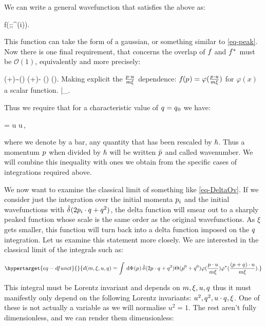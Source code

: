 \documentclass[
  10pt,
  a4paper,
  DIV=11,
  numbers=noendperiod,
  twoside]{scrreprt}
\let\[\relax \let\]\relax %
\DeclareRobustCommand{\[}{\begin{equation}}
\DeclareRobustCommand{\]}{\end{equation}}
\begin{document}
We can write a general wavefunction that satisfies the above as:

\[
f(\vert\cls{\vel[i]};\mass[i] ;\beta^{(i)}).
\]

This function can take the form of a gaussian, or something similar to
\ref{eq-peak}. Now there is one final requirement, that concerns the
overlap of \(\wf\) and \(\cwf\) must be \(\mathcal{O}(1)\), equivalently
and more precisely:

\[
\cwf(\emom+\tm)\sim \cwf(\emom) \implies \cwf(\emom+\tm)- \cwf(\emom) \implies \ct{\tm}\cwf(\emom).
\] Making explicit the \(\frac{\emom \cdot u }{m \xi}\) dependence:
\(\wf(\emom)=\varphi(\frac{\emom \cdot u }{m \xi})\) for \(\varphi(x)\)
a scalar function.
\[\implies {}\Bigr|_{}.\]

Thus we require that for a characteristic value of \(\tm=\co[0]{\tm}\)
we have:

\[
=\co[0]{\tw} \cdot u\iff \co[0]{\tw} \cdot u\,\wfwidth\ll \sqrt{ \xi},
\]

where we denote by a bar, any quantity that has been rescaled by
\(\hbar\). Thus a momentum \(\emom\) when divided by \(\hbar\) will be
written \(\bar{\emom}\) and called wavenumber. We will combine this
inequality with ones we obtain from the specific cases of integrations
required above.

We now want to examine the classical limit of something like
\ref{eq-DeltaOv}. If we consider just the integration over the initial
momenta \(\emom[i]\) and the initial wavefunctions with
\(\ndeltafn{2 \emom[i] \cdot \tm+\tm^2}\), the delta function will smear
out to a sharply peaked function whose scale is the same order as the
original wavefunctions. As \(\xi\) gets smaller, this function will turn
back into a delta function imposed on the \(\tm\) integration. Let us
examine this statement more closely. We are interested in the classical
limit of the integrals such as:

\begin{equation}\protect\hypertarget{eq-dfunct}{}{
d(m,\xi,u,\tm)=\int \ddP{\emom} \ndeltafn{2 \emom \cdot \tm+\tm^2} \thetafn{\emom^0+\tm^0}\varphi(\frac{\emom \cdot u }{m \xi})\varphi^*(\frac{(\emom+\tm) \cdot u }{m \xi}).
}\label{eq-dfunct}\end{equation}

This integral must be Lorentz invariant and depends on \(m,\xi, u,\tm\)
thus it must manifestly only depend on the following Lorentz invariants:
\(u^2,\tm^2,u \cdot \tm, \xi\). One of these is not actually a variable
as we will normalise \(u^2=1\). The rest aren't fully dimensionless, and
we can render them dimensionless:
\end{document}
